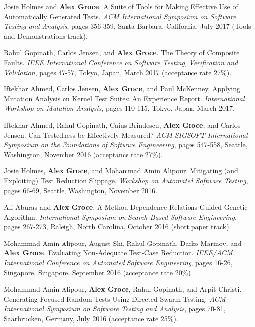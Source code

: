 \documentclass[ComputerScience]{vita}
\begin{document}
\begin{vita}
\begin{Refereed Conference and Workshop Publications}
\item Josie Holmes and {\bf Alex Groce}.
\newblock A Suite of Tools for Making Effective Use of Automatically Generated Tests.
\newblock \emph{ACM International Symposium on Software Testing and Analysis}, pages 356-359, Santa Barbara, California, July 2017 (Tools and Demonstrations track).

\item Rahul Gopinath, Carlos Jensen, and {\bf Alex Groce}.
\newblock The Theory of Composite Faults.
\newblock \emph{IEEE International Conference on Software Testing, Verification and Validation}, pages 47-57, Tokyo, Japan, March 2017 (acceptance rate 27\%).

\item Iftekhar Ahmed, Carlos Jensen, {\bf Alex Groce}, and Paul McKenney.
\newblock Applying Mutation Analysis on Kernel Test Suites: An Experience Report.
\newblock \emph{International Workshop on Mutation Analysis}, pages 110-115, Tokyo, Japan, March 2017.

\item Iftekhar Ahmed, Rahul Gopinath, Caius Brindescu, {\bf Alex Groce}, and Carlos Jensen.
\newblock Can Testedness be Effectively Measured?
\newblock \emph{ACM SIGSOFT International Symposium on the Foundations of Software Engineering},  pages 547-558, Seattle, Washington, November 2016 (acceptance rate 27\%).

\item Josie Holmes, {\bf Alex Groce}, and Mohammad Amin Alipour.
\newblock Mitigating (and Exploiting) Test Reduction Slippage.
\newblock \emph{Workshop on Automated Software Testing}, pages 66-69, Seattle, Washington, November 2016.

\item Ali Aburas and {\bf Alex Groce}.
\newblock A Method Dependence Relations Guided Genetic Algorithm.
\newblock \emph{International Symposium on Search-Based Software Engineering}, pages 267-273, Raleigh, North Carolina, October 2016 (short paper track).

\item Mohammad Amin Alipour, August Shi, Rahul Gopinath, Darko Marinov, and {\bf Alex Groce}.
\newblock Evaluating Non-Adequate Test-Case Reduction.
\newblock \emph{IEEE/ACM International Conference on Automated Software Engineering}, pages 16-26, Singapore, Singapore, September 2016 (acceptance rate 20\%).

\item Mohammad Amin Alipour, {\bf Alex Groce}, Rahul Gopinath, and Arpit Christi.
\newblock Generating Focused Random Tests Using Directed Swarm Testing.
\newblock \emph{ACM International Symposium on Software Testing and Analysis}, pages 70-81, Saarbrucken, Germany, July 2016 (acceptance rate 25\%).


\end{Refereed Conference and Workshop Publications}
\end{vita}
\end{document}
